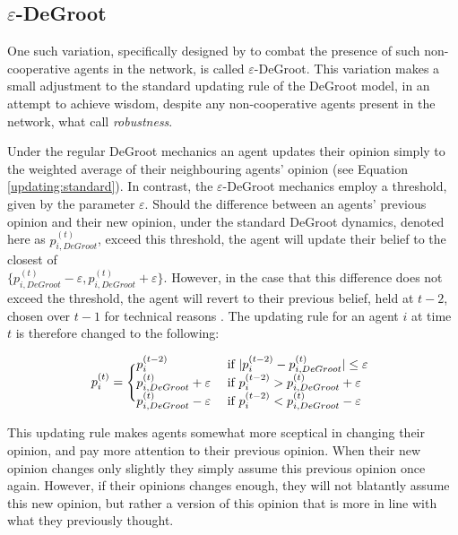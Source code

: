 \documentclass[a4paper, 12pt]{report}
\newcommand{\beli}[3][2]{p_{#2}^{(#3)}}
\begin{document}
\subsection{$\varepsilon$-DeGroot}
\label{updating:epsilon}
One such variation, specifically designed by \cite{amir2021robust} to combat the presence of such non-cooperative agents in the network, is called $\varepsilon$-DeGroot. This variation makes a small adjustment to the standard updating rule of the DeGroot model, in an attempt to achieve wisdom, despite any non-cooperative agents present in the network, what \cite{amir2021robust} call \emph{robustness}.

\noindent Under the regular DeGroot  mechanics an agent updates their opinion simply to the weighted average of their neighbouring agents' opinion (see Equation \ref{updating:standard}). In contrast, the $\varepsilon$-DeGroot mechanics employ a threshold, given by the parameter $\varepsilon$. Should the difference between an agents' previous opinion and their new opinion, under the standard DeGroot dynamics, denoted here as $\beli{i, DeGroot}{t}$, exceed this threshold, the agent will update their belief to the closest of \\ $\{\beli{i, DeGroot}{t} - \varepsilon, \beli{i, DeGroot}{t} + \varepsilon\}$. However, in the case that this difference does not exceed the threshold, the agent will revert to their previous belief, held at $t-2$, chosen over $t-1$ for technical reasons \parencite{amir2021robust}. The updating rule for an agent $i$ at time $t$ is therefore changed to the following:

\begin{equation*}
    \label{edegroot:updating}
  \beli{i}{t} =\Bigg\{
  \begin{matrix*}[l]
      \beli{i}{t-2} & \text{ if } |\beli{i}{t-2} - \beli{i, DeGroot}{t}| \leq \varepsilon\\
      \beli{i, DeGroot}{t} + \varepsilon & \text{ if } \beli{i}{t-2} > \beli{i, DeGroot}{t} + \varepsilon\\
      \beli{i, DeGroot}{t} - \varepsilon & \text{ if } \beli{i}{t-2} < \beli{i, DeGroot}{t} - \varepsilon
  \end{matrix*} \\
\end{equation*}

This updating rule makes agents somewhat more sceptical in changing their opinion, and pay more attention to their previous opinion. When their new opinion changes only slightly they simply assume this previous opinion once again. However, if their opinions changes enough, they will not blatantly assume this new opinion, but rather a version of this opinion that is more in line with what they previously thought.
\end{document}
